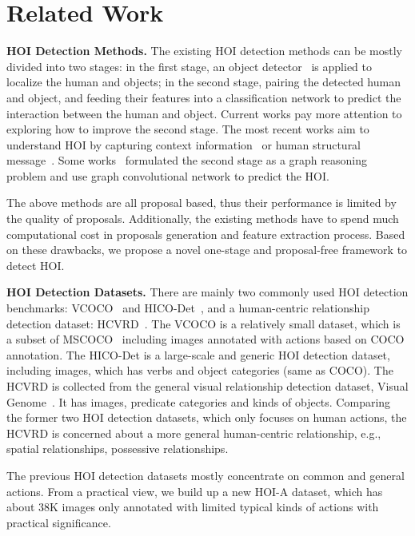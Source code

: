\documentclass[10pt,twocolumn,letterpaper]{article}
\begin{document}
\section{Related Work}
\noindent\textbf{HOI Detection Methods.}
The existing HOI detection methods can be mostly divided into two stages: in the first stage, an object detector~\cite{ren2015faster} is applied to localize the human and objects; in the second stage, pairing the detected human and object, and feeding their features into a classification network to predict the interaction between the human and object. Current works pay more attention to exploring how to improve the second stage. The most recent works aim to understand HOI by capturing context information~\cite{gao2018ican,Wang_2019_ICCV} or human structural message~\cite{Wan_2019_ICCV,feng2019turbo,fang2018pairwise,Zhou_2019_ICCV}. Some works~\cite{qi2018learning,Xu_2019_CVPR,Zhou_2019_ICCV} formulated the second stage as a graph reasoning problem and use graph convolutional network to predict the HOI. 

The above methods are all proposal based, thus their performance is limited by the quality of proposals. Additionally, the existing methods have to spend much computational cost in proposals generation and feature extraction process.  
Based on these drawbacks, we propose a novel one-stage and proposal-free framework to detect HOI.

\noindent\textbf{HOI Detection Datasets.}
There are mainly two commonly used HOI detection benchmarks:  VCOCO~\cite{gupta2015visual} and HICO-Det~\cite{chao2018learning}, and a human-centric relationship detection dataset: HCVRD~\cite{zhuang2017care}. The VCOCO is a relatively small dataset, which is a subset of MSCOCO~\cite{lin2014microsoft} including  images annotated with  actions based on COCO annotation. The HICO-Det is a large-scale and generic HOI detection dataset, including  images, which has  verbs and  object categories (same as COCO). The HCVRD is collected from the general visual relationship detection dataset, Visual Genome~\cite{krishna2017visual}. It has  images,  predicate categories and  kinds of objects.  Comparing the former two HOI detection datasets, which only focuses on human actions,
 the HCVRD is concerned about a more general human-centric relationship, e.g., spatial relationships, possessive relationships.

The previous HOI detection datasets mostly concentrate on common and general actions. From a practical view, we build up a new HOI-A dataset, which has about 38K images only annotated with limited typical kinds of actions with practical significance. 
\end{document}
